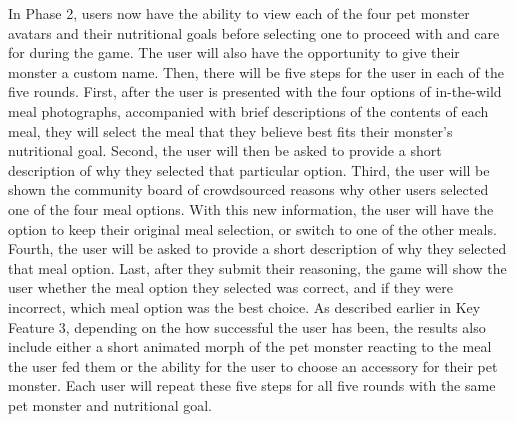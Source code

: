 In Phase 2, users now have the ability to view each of the four pet monster avatars and their nutritional goals before selecting one to proceed with and care for during the game. The user will also have the opportunity to give their monster a custom name. 
Then, there will be five steps for the user in each of the five rounds. 
First, after the user is presented with the four options of in-the-wild meal photographs, accompanied with brief descriptions of the contents of each meal, they will select the meal that they believe best fits their monster’s nutritional goal.  
Second, the user will then be asked to provide a short description of why they selected that particular option. 
Third, the user will be shown the community board of crowdsourced reasons why other users selected one of the four meal options. With this new information, the user will have the option to keep their original meal selection, or switch to one of the other meals.
Fourth, the user will be asked to provide a short description of why they selected that meal option.
Last, after they submit their reasoning, the game will show the user whether the meal option they selected was correct, and if they were incorrect, which meal option was the best choice. 
As described earlier in Key Feature 3, depending on the how successful the user has been, the results also include either a short animated morph of the pet monster reacting to the meal the user fed them or the ability for the user to choose an accessory for their pet monster.
Each user will repeat these five steps for all five rounds with the same pet monster and nutritional goal.


